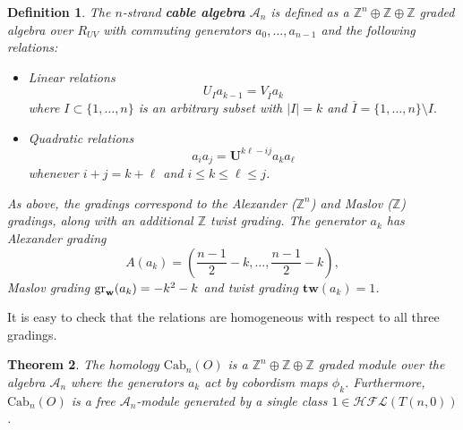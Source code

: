 \documentclass[10pt,a4paper]{amsart}
\newtheorem{theorem}{Theorem}[section]
\newtheorem{definition}[theorem]{Definition}
\newcommand{\CA}{\mathcal{A}}
\newcommand{\Cab}{\mathrm{Cab}}
\newcommand{\cHFL}{\mathcal{H\!F\! L}}
\newcommand{\tw}{\mathbf{tw}}
\newcommand{\w}{\mathbf{w}}
\newcommand{\newword}[1]{\emph{\textbf{#1}}}
\def\gr{\textup{gr}}
\def\w{{\bf{w}}}
\newcommand{\Z}{\mathbb{Z}}
\newcommand{\UU}{\mathbf{U}}
\renewcommand{\AA}[1]{{\color{blue}#1}}
\newcommand{\EG}[1]{{\color{red}#1}}
\begin{document}
\begin{definition}
The $n$-strand \newword{cable algebra} $\CA_n$ is defined as a $\Z^n\oplus \Z\oplus \Z$ graded algebra  over $R_{UV}$ with commuting generators $a_0,\ldots,a_{n-1}$ and the following relations:
\begin{itemize}
\item Linear relations
\begin{equation}
\label{eq: linear}
U_Ia_{k-1}=V_{\overline{I}}a_k
\end{equation}
where $I\subset \{1,\ldots,n\}$ is an arbitrary subset with $|I|=k$ and $\overline{I}=\{1,\ldots,n\}\setminus I.$ 
\item Quadratic relations
\begin{equation}
\label{eq: quadratic}
a_ia_j=\UU^{k\ell-ij}a_{k}a_{\ell}
\end{equation} 
whenever $i+j=k+\ell$ and $i\le k\le \ell\le j$.
\end{itemize}
As above, the gradings correspond to the Alexander ($\Z^n$) and Maslov ($\Z$) gradings, along with an additional  $\Z$ \emph{twist grading}. The generator $a_k$ has Alexander grading 
$$
A(a_k)=\left(\frac{n-1}{2}-k,\ldots, \frac{n-1}{2}-k\right),
$$
Maslov grading $\gr_{\w}(a_k)=-k^2-k$ and twist grading $\tw(a_k)=1$.
\end{definition}

It is easy to check that the relations are homogeneous with respect to all three gradings.

\begin{theorem}
\label{thm: cabled algebra}
The homology $\Cab_n(O)$ is a $\Z^n\oplus \Z\oplus \Z$ graded module over the algebra $\CA_n$ where the generators $a_k$ act by cobordism maps $\phi_k$. Furthermore, $\Cab_n(O)$ is a free $\CA_n$-module generated by a single class $1\in \cHFL(T(n,0))$.
\end{theorem}
\end{document}
